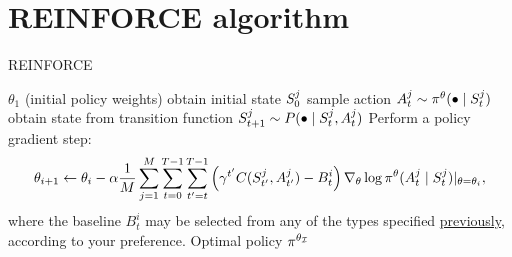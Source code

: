 \documentclass[12pt,twoside]{../../mitthesis}
\begin{document}
\section*{REINFORCE algorithm}
\begin{algorithm}
    \caption{REINFORCE}
    \label{alg:my-alg}
    \begin{algorithmic}[1]
     $\theta_1$ (initial policy weights)
            \STATE obtain initial state $S_0^{j}$
                \STATE sample action $A_t^j \sim \pi^{\theta}(\bullet \mid S_t^{j})$
                \STATE obtain state from transition function $S_{t+1}^j \sim P(\bullet \mid S_t^j, A_t^j)$
            \ENDFOR
        \ENDFOR
        \STATE  Perform a policy gradient step:
        $$
            \theta_{i+1} \leftarrow \theta_i - \alpha \frac{1}{M}\sum_{j = 1}^M \sum_{t = 0}^{T-1}\sum_{t'=t}^{T-1}\left( \gamma^{t'} C(S_{t'}^j, A_{t'}^j) - B_{t}^i\right) \nabla_{\theta}\log \pi^{\theta}(A_t^j \mid S_t^j)\rvert_{\theta = \theta_i},
        $$
        \STATE where the baseline $B_t^i$ may be selected from any of the types specified \hyperlink{baseline-and-do-not-let-the-past-distract-you-principle}{previously}, according to your preference.
    \ENDFOR
    \STATE \RETURN Optimal policy $\pi^{\theta_{\mathcal I}}$
    \end{algorithmic}
\end{algorithm}
\end{document}
